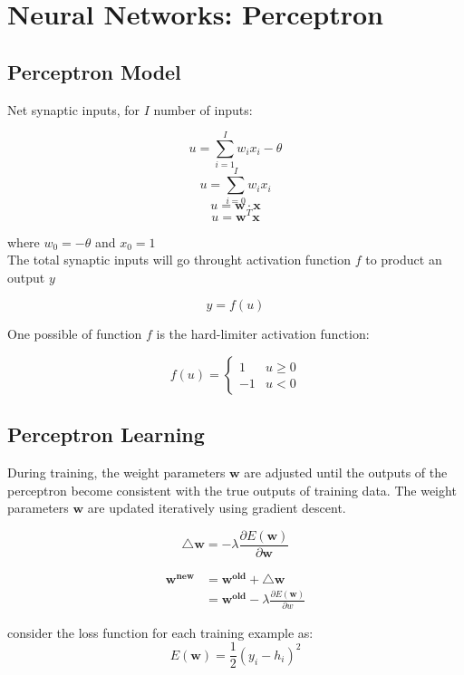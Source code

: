 \chapter{Neural Networks: Perceptron}
\begin{multicols}{2}

\section{Perceptron Model}

\noindent Net synaptic inputs, for $I$ number of inputs:

$$u = \sum_{i=1}^I w_i x_i - \theta$$
$$u = \sum_{i=0}^I w_i x_i$$
$$u = \mathbf{w} \cdot \mathbf{x}$$
$$u = \mathbf{w}^T \mathbf{x}$$

\noindent where $w_0=-\theta$ and $x_0=1$ \\

\noindent The total synaptic inputs will go throught activation function $f$ to product an output $y$ 

$$y=f(u)$$

\noindent One possible of function $f$ is the hard-limiter activation function:

$$
f(u) = 
\begin{cases}
1 & u \ge 0\\
-1 & u < 0
\end{cases}
$$

\section{Perceptron Learning}

During training, the weight parameters $\mathbf{w}$ are adjusted until the outputs of the perceptron become consistent with the true outputs of training data. The weight parameters $\mathbf{w}$ are updated iteratively using gradient descent. 

$$\mathbf{\triangle w} = - \lambda \frac{\partial E(\mathbf{w})}{\partial \mathbf{w}}$$

\begin{equation*}
\begin{split}
\mathbf{w^{new}} &= \mathbf{w^{old} + \triangle w } \\
&= \mathbf{w^{old}} - \lambda \frac{\partial E(\mathbf{w})}{\partial w}
\end{split}
\end{equation*}

\noindent consider the loss function for each training example as:
$$E(\mathbf{w})=\frac{1}{2}(y_i-h_i)^{2}$$


\end{multicols}
